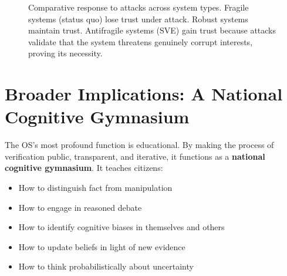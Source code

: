 \documentclass[11pt,a4paper]{article}
\begin{document}
\begin{figure}[h!]
\centering
{}
\caption{Comparative response to attacks across system types. Fragile systems (status quo) lose trust under attack. Robust systems maintain trust. Antifragile systems (SVE) gain trust because attacks validate that the system threatens genuinely corrupt interests, proving its necessity.}
\label{fig:antifragile}
\end{figure}

\section{Broader Implications: A National Cognitive Gymnasium}
The OS's most profound function is educational. By making the process of verification public, transparent, and iterative, it functions as a \textbf{national cognitive gymnasium}. It teaches citizens:

\begin{itemize}[nosep]
    \item How to distinguish fact from manipulation
    \item How to engage in reasoned debate
    \item How to identify cognitive biases in themselves and others
    \item How to update beliefs in light of new evidence
    \item How to think probabilistically about uncertainty
\end{itemize}
\end{document}
